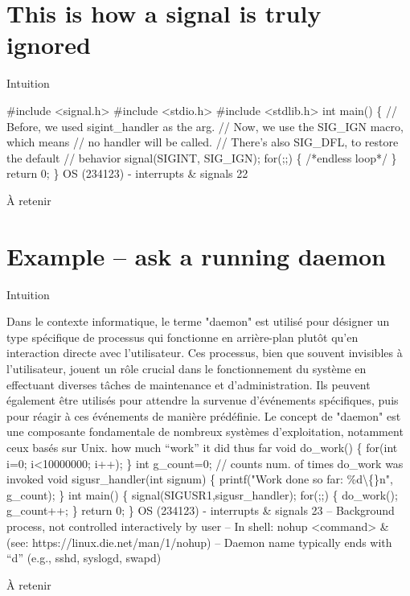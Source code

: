 \documentclass[12pt]{article}
\begin{document}
\section{This is how a signal is truly ignored}
\begin{myvulga}{Intuition}
\end{myvulga}
\#include <signal.h>
\#include <stdio.h>
\#include <stdlib.h>
int main() \{
// Before, we used sigint\_handler as the arg.
// Now, we use the SIG\_IGN macro, which means
// no handler will be called.
// There’s also SIG\_DFL, to restore the default
// behavior
signal(SIGINT, SIG\_IGN);
for(;;) \{ /*endless loop*/ \}
return 0;
\}
OS (234123) - interrupts \& signals
22
\begin{aretenir}{À retenir}
\end{aretenir}

\section{Example – ask a running daemon }
\begin{myvulga}{Intuition}
\end{myvulga}
Dans le contexte informatique, le terme "daemon" est utilisé pour désigner un type spécifique de processus qui fonctionne en arrière-plan plutôt qu'en interaction directe avec l'utilisateur. Ces processus, bien que souvent invisibles à l'utilisateur, jouent un rôle crucial dans le fonctionnement du système en effectuant diverses tâches de maintenance et d'administration. Ils peuvent également être utilisés pour attendre la survenue d'événements spécifiques, puis pour réagir à ces événements de manière prédéfinie. Le concept de "daemon" est une composante fondamentale de nombreux systèmes d'exploitation, notamment ceux basés sur Unix.
how much “work” it did thus far
void do\_work() \{ for(int i=0; i<10000000; i++); \}
int g\_count=0; // counts num. of times do\_work was invoked
void sigusr\_handler(int signum) \{
printf("Work done so far: \%d\textbackslash\{\}n", g\_count);
\}
int main() \{
signal(SIGUSR1,sigusr\_handler);
for(;;) \{ do\_work(); g\_count++; \}
return 0;
\}
OS (234123) - interrupts \& signals
23
– Background process, not controlled interactively by user
– In shell: nohup <command> \& (see: https://linux.die.net/man/1/nohup)
– Daemon name typically ends with “d” (e.g., sshd, syslogd, swapd)
\begin{aretenir}{À retenir}
\end{aretenir}
\end{document}
